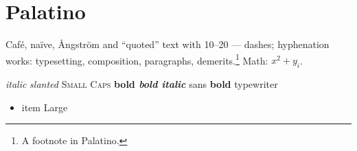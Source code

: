 \documentclass[11pt]{article}
\begin{document}
\section{Palatino}
Café, naïve, Ångström and ``quoted'' text with 10--20 --- dashes; hyphenation works: typesetting, composition, paragraphs, demerits.\footnote{A footnote in Palatino.} Math: $x^2+y_i$.

{\itshape italic} {\slshape slanted} {\scshape Small Caps} {\bfseries bold \itshape bold italic} {\sffamily sans \bfseries bold} {\ttfamily typewriter}
\begin{itemize}
\item {\small item} {\Large Large}
\end{itemize}
\end{document}

